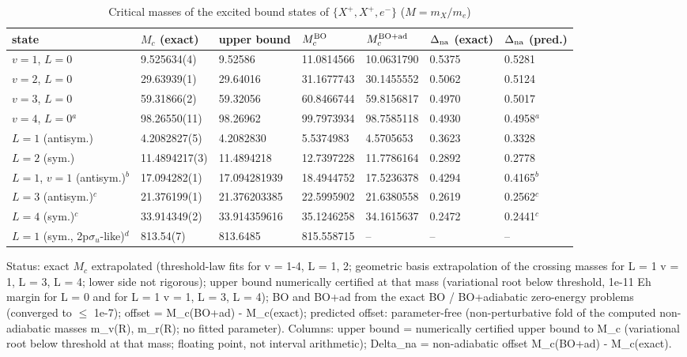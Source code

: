\begin{table}[t]
\footnotesize
\caption{Critical masses of the excited bound states of $\{X^+,X^+,e^-\}$ ($M=m_X/m_e$)}
\label{tab:t1}
\begin{tabular*}{\textwidth}{@{\extracolsep{\fill}}lllllll}
\toprule
state & $M_c$ (exact) & upper bound & $M_c^{\rm BO}$ & $M_c^{\rm BO+ad}$ & $\Delta_{\rm na}$ (exact) & $\Delta_{\rm na}$ (pred.) \\
\midrule
$v=1$, $L=0$ & 9.525634(4) & 9.52586 & 11.0814566 & 10.0631790 & 0.5375 & 0.5281 \\
$v=2$, $L=0$ & 29.63939(1) & 29.64016 & 31.1677743 & 30.1455552 & 0.5062 & 0.5124 \\
$v=3$, $L=0$ & 59.31866(2) & 59.32056 & 60.8466744 & 59.8156817 & 0.4970 & 0.5017 \\
$v=4$, $L=0$$^a$ & 98.26550(11) & 98.26962 & 99.7973934 & 98.7585118 & 0.4930 & 0.4958$^a$ \\
$L=1$ (antisym.) & 4.2082827(5) & 4.2082830 & 5.5374983 & 4.5705653 & 0.3623 & 0.3328 \\
$L=2$ (sym.) & 11.4894217(3) & 11.4894218 & 12.7397228 & 11.7786164 & 0.2892 & 0.2778 \\
$L=1$, $v=1$ (antisym.)$^b$ & 17.094282(1) & 17.094281939 & 18.4944752 & 17.5236378 & 0.4294 & 0.4165$^b$ \\
$L=3$ (antisym.)$^c$ & 21.376199(1) & 21.376203385 & 22.5995902 & 21.6380558 & 0.2619 & 0.2562$^c$ \\
$L=4$ (sym.)$^c$ & 33.914349(2) & 33.914359616 & 35.1246258 & 34.1615637 & 0.2472 & 0.2441$^c$ \\
$L=1$ (sym., 2p$\sigma_u$-like)$^d$ & 813.54(7) & 813.6485 & 815.558715 & -- & -- & -- \\
\bottomrule
\end{tabular*}
\par\footnotesize Status: exact $M_c$ extrapolated (threshold-law fits for v = 1-4, L = 1, 2; geometric basis extrapolation of the crossing masses for L = 1 v = 1, L = 3, L = 4; lower side not rigorous); upper bound numerically certified at that mass (variational root below threshold, 1e-11 Eh margin for L = 0 and for L = 1 v = 1, L = 3, L = 4); BO and BO+ad from the exact BO / BO+adiabatic zero-energy problems (converged to $\le$ 1e-7); offset = M\_c(BO+ad) - M\_c(exact); predicted offset: parameter-free (non-perturbative fold of the computed non-adiabatic masses m\_v(R), m\_r(R); no fitted parameter). Columns: upper bound = numerically certified upper bound to M\_c (variational root below threshold at that mass; floating point, not interval arithmetic); Delta\_na = non-adiabatic offset M\_c(BO+ad) - M\_c(exact).

\end{table}
